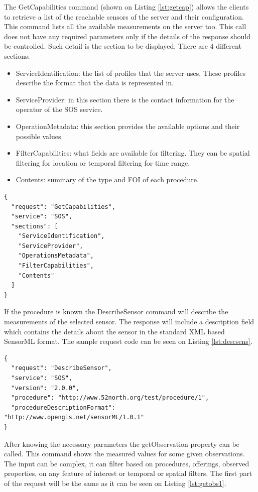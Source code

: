 The GetCapabilities command (shown on Listing \ref{lst:getcap}) allows the clients to retrieve a list of the reachable sensors of the server and their configuration. This command lists all the available measurements on the server too. This call does not have any required parameters only if the details of the response should be controlled. Such detail is the section to be displayed. There are 4 different sections:
\begin{itemize}
\item ServiceIdentification: the list of profiles that the server uses. These profiles describe the format that the data is represented in.
\item ServiceProvider: in this section there is the contact information for the operator of the SOS service.
\item OperationMetadata: this section provides the available options and their possible values.
\item FilterCapabilities: what fields are available for filtering. They can be spatial filtering for location or temporal filtering for time range.
\item Contents: summary of the type and FOI of each procedure. 
\end{itemize}

\begin{lstlisting}[caption={JSON getCapabilities POST request\label{lst:getcap}}]
{
  "request": "GetCapabilities",
  "service": "SOS",
  "sections": [
    "ServiceIdentification",
    "ServiceProvider",
    "OperationsMetadata",
    "FilterCapabilities",
    "Contents"
  ]
}
\end{lstlisting}

 If the procedure is known the DescribeSensor command will describe the measurements of the selected sensor. The response will include a description field which contains the details about the sensor in the standard XML based SensorML format. The sample request code can be seen on Listing \ref{lst:descsens}.

\begin{lstlisting}[caption={JSON DescribeSensor POST request\label{lst:descsens}}]
{
  "request": "DescribeSensor",
  "service": "SOS",
  "version": "2.0.0",
  "procedure": "http://www.52north.org/test/procedure/1",
  "procedureDescriptionFormat": "http://www.opengis.net/sensorML/1.0.1"
}
\end{lstlisting}

After knowing the necessary parameters the getObservation property can be called. This command shows the measured values for some given observations. The input can be complex, it can filter based on procedures, offerings, observed properties, on any feature of interest or temporal or spatial filters. The first part of the request will be the same as it can be seen on Listing \ref{lst:getobs1}.


